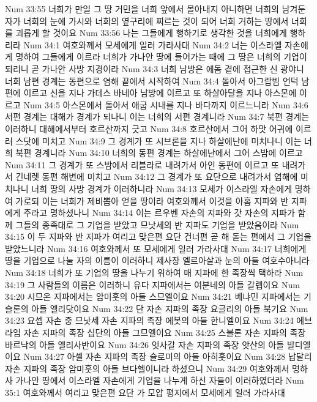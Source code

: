 Num 33:55  너희가 만일 그 땅 거민을 너희 앞에서 몰아내지 아니하면 너희의 남겨둔 자가 너희의 눈에 가시와 너희의 옆구리에 찌르는 것이 되어 너희 거하는 땅에서 너희를 괴롭게 할 것이요
Num 33:56  나는 그들에게 행하기로 생각한 것을 너희에게 행하리라
Num 34:1  여호와께서 모세에게 일러 가라사대
Num 34:2  너는 이스라엘 자손에게 명하여 그들에게 이르라 너희가 가나안 땅에 들어가는 때에 그 땅은 너희의 기업이 되리니 곧 가나안 사방 지경이라
Num 34:3  너희 남방은 에돔 곁에 접근한 신 광야니 너희 남편 경계는 동편으로 염해 끝에서 시작하여
Num 34:4  돌아서 아그랍빔 언덕 남편에 이르고 신을 지나 가데스 바네아 남방에 이르고 또 하살아달을 지나 아스몬에 이르고
Num 34:5  아스몬에서 돌아서 애굽 시내를 지나 바다까지 이르느니라
Num 34:6  서편 경계는 대해가 경계가 되나니 이는 너희의 서편 경계니라
Num 34:7  북편 경계는 이러하니 대해에서부터 호르산까지 긋고
Num 34:8  호르산에서 그어 하맛 어귀에 이르러 스닷에 미치고
Num 34:9  그 경계가 또 시브론을 지나 하살에난에 미치나니 이는 너희 북편 경계니라
Num 34:10  너희의 동편 경계는 하살에난에서 그어 스밤에 이르고
Num 34:11  그 경계가 또 스밤에서 리블라로 내려가서 아인 동편에 이르고 또 내려가서 긴네렛 동편 해변에 미치고
Num 34:12  그 경계가 또 요단으로 내려가서 염해에 미치나니 너희 땅의 사방 경계가 이러하니라
Num 34:13  모세가 이스라엘 자손에게 명하여 가로되 이는 너희가 제비뽑아 얻을 땅이라 여호와께서 이것을 아홉 지파와 반 지파에게 주라고 명하셨나니
Num 34:14  이는 르우벤 자손의 지파와 갓 자손의 지파가 함께 그들의 종족대로 그 기업을 받았고 므낫세의 반 지파도 기업을 받았음이라
Num 34:15  이 두 지파와 반 지파가 여리고 맞은편 요단 건너편 곧 해 돋는 편에서 그 기업을 받았느니라
Num 34:16  여호와께서 또 모세에게 일러 가라사대
Num 34:17  너희에게 땅을 기업으로 나눌 자의 이름이 이러하니 제사장 엘르아살과 눈의 아들 여호수아니라
Num 34:18  너희가 또 기업의 땅을 나누기 위하여 매 지파에 한 족장씩 택하라
Num 34:19  그 사람들의 이름은 이러하니 유다 지파에서는 여분네의 아들 갈렙이요
Num 34:20  시므온 지파에서는 암미훗의 아들 스므엘이요
Num 34:21  베냐민 지파에서는 기슬론의 아들 엘리닷이요
Num 34:22  단 자손 지파의 족장 요글리의 아들 북기요
Num 34:23  요셉 자손 중 므낫세 자손 지파의 족장 에봇의 아들 한니엘이요
Num 34:24  에브라임 자손 지파의 족장 십단의 아들 그므엘이요
Num 34:25  스블론 자손 지파의 족장 바르낙의 아들 엘리사반이요
Num 34:26  잇사갈 자손 지파의 족장 앗산의 아들 발디엘이요
Num 34:27  아셀 자손 지파의 족장 슬로미의 아들 아히훗이요
Num 34:28  납달리 자손 지파의 족장 암미훗의 아들 브다헬이니라 하셨으니
Num 34:29  여호와께서 명하사 가나안 땅에서 이스라엘 자손에게 기업을 나누게 하신 자들이 이러하였더라
Num 35:1  여호와께서 여리고 맞은편 요단 가 모압 평지에서 모세에게 일러 가라사대
